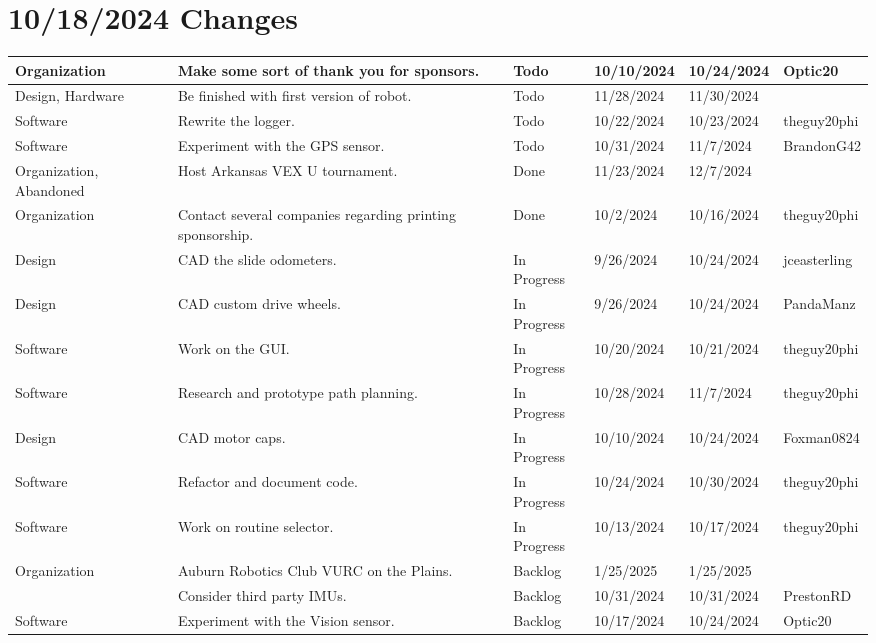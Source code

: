 \section{10/18/2024 Changes}
\begin{center}
\begin{longtable}{| p{40pt} | p{150pt} | p{35pt} | p{33pt} | p{33pt} | p{40pt} |}
\hline \rowcolor{IndianRed1}
Organization & Make some sort of thank you for sponsors. & Todo & 10/10/2024 & 10/24/2024 & Optic20 \\
\hline \rowcolor{IndianRed1}
Design, Hardware & Be finished with first version of robot. & Todo & 11/28/2024 & 11/30/2024 & \\
\hline \rowcolor{IndianRed1}
Software & Rewrite the logger. & Todo & 10/22/2024 & 10/23/2024 & theguy20phi \\
\hline \rowcolor{IndianRed1}
Software & Experiment with the GPS sensor. & Todo & 10/31/2024 & 11/7/2024 & BrandonG42 \\
\hline \rowcolor{DarkSeaGreen1}
Organization, Abandoned & Host Arkansas VEX U tournament. & Done & 11/23/2024 & 12/7/2024 & \\
\hline \rowcolor{DarkSeaGreen1}
Organization & Contact several companies regarding printing sponsorship. & Done & 10/2/2024 & 10/16/2024 & theguy20phi \\
\hline \rowcolor{LightGoldenrod1}
Design & CAD the slide odometers. & In Progress & 9/26/2024 & 10/24/2024 & jceasterling \\
\hline \rowcolor{LightGoldenrod1}
Design & CAD custom drive wheels. & In Progress & 9/26/2024 & 10/24/2024 & PandaManz \\
\hline \rowcolor{LightGoldenrod1}
Software & Work on the GUI. & In Progress & 10/20/2024 & 10/21/2024 & theguy20phi \\
\hline \rowcolor{LightGoldenrod1}
Software & Research and prototype path planning. & In Progress & 10/28/2024 & 11/7/2024 & theguy20phi \\
\hline \rowcolor{LightGoldenrod1}
Design & CAD motor caps. & In Progress & 10/10/2024 & 10/24/2024 & Foxman0824 \\
\hline \rowcolor{LightGoldenrod1}
Software & Refactor and document code. & In Progress & 10/24/2024 & 10/30/2024 & theguy20phi \\
\hline \rowcolor{LightGoldenrod1}
Software & Work on routine selector. & In Progress & 10/13/2024 & 10/17/2024 & theguy20phi \\
\hline \rowcolor{Ivory2}
Organization & Auburn Robotics Club VURC on the Plains. & Backlog & 1/25/2025 & 1/25/2025 & \\
\hline \rowcolor{Ivory2}
& Consider third party IMUs. & Backlog & 10/31/2024 & 10/31/2024 & PrestonRD \\
\hline \rowcolor{Ivory2}
Software & Experiment with the Vision sensor. & Backlog & 10/17/2024 & 10/24/2024 & Optic20 \\
\hline
\end{longtable}
\end{center}


